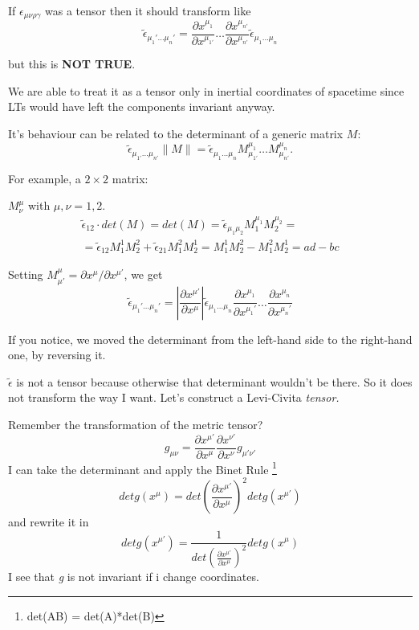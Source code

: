 If $\epsilon_{\mu \nu \rho \gamma }$ was a tensor then it should transform like
\begin{equation}
\tilde{\epsilon}_{\mu_{1}' \ldots \mu_{n}'} = \frac{\partial x^{\mu_{1}}}{\partial x^{\mu_{1'}}} \ldots \frac{\partial x^{\mu_{n'}}}{\partial x^{\mu_{n'}}} \tilde{\epsilon}_{\mu_{1}\ldots \mu_{n}}
\end{equation}

but this is \textbf{NOT TRUE}.\par
 

We are able to treat it as a tensor only in inertial coordinates of spacetime since LTs would have left the components invariant anyway.\par
It's behaviour can be related to the determinant of a generic matrix $M$:
\[
\tilde{\epsilon}_{\mu_{1'}\ldots \mu_{n'}} \|M\| = \tilde{\epsilon}_{\mu_{1}\ldots \mu_{n}} M^{\mu_{1}}_{\mu_{1'}} \ldots M^{\mu_{n}}_{\mu_{n'}}.
\]

For example, a $2\times 2$ matrix:\par
$M^{\mu }_{\nu }$ with $\mu ,\nu =1,2$.
\begin{gather}
	\tilde{\epsilon }_{12} \cdot det\left( M \right) = det\left( M \right)= \tilde{\epsilon }_{\mu_{1}\mu_{2}} M^{\mu_{1}}_{1} M^{\mu_{2}}_{2} = \\
	= \tilde{\epsilon }_{12} M^{1}_{1} M^{2}_{2} + \tilde{\epsilon }_{21}M^{2}_{1}M^{1}_{2} = M^{1}_{1}M^{2}_{2} - M^{2}_{1}M^{1}_{2} = ad- bc
\end{gather}\par

Setting $M^{\mu }_{\mu '} = \partial x^{\mu } / \partial x^{\mu '} $, we get
\[
\tilde{\epsilon }_{\mu_{1}' \ldots \mu_{n}'} = \left| \frac{\partial x^{\mu '}}{\partial x^{\mu }} \right| \tilde{\epsilon }_{\mu _{1}\ldots \mu_{n}} \frac{\partial x^{\mu _{1}}}{\partial x^{\mu _{1}'}} \ldots \frac{\partial x^{\mu _{n}}}{\partial x^{\mu_{n}'}} 
\]

If you notice, we moved the determinant from the left-hand side to the right-hand one, by reversing it.\par
$\tilde{\epsilon }$ is not a tensor because otherwise that determinant wouldn't be there. So it does not transform the way I want. Let's construct a Levi-Civita \emph{tensor.}\par
Remember the transformation of the metric tensor?
\[
g_{\mu \nu }= \frac{\partial x^{\mu '}}{\partial x^{\mu }} \frac{\partial x^{\nu '}}{\partial x^{\nu }} g_{\mu '\nu '}
\]
I can take the determinant and apply the Binet Rule \footnote{det(AB) = det(A)*det(B)}
\[
det g\left( x^{\mu } \right) = det\left( \frac{\partial x^{\mu '}}{\partial x^{\mu }}  \right)^{2} det g\left( x^{\mu '} \right)
\]
and rewrite it in 
\[
det g\left( x^{\mu '} \right) = \frac{1}{det\left( \frac{\partial x^{\mu '}}{\partial x^{\mu }}  \right)^{2}} det g\left( x^{\mu } \right)
\]
I see that \emph{g} is not invariant if i change coordinates.


